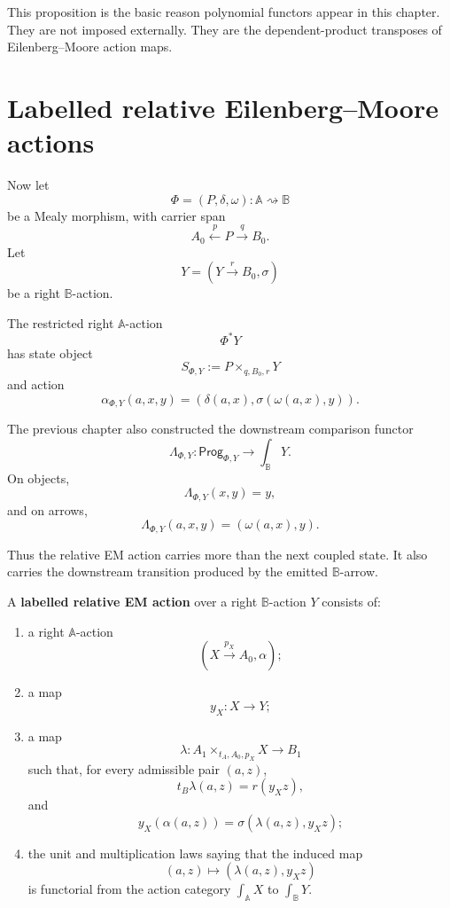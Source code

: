 \begin{remark}
\label{rem:poly-relative-first-inevitability}
This proposition is the basic reason polynomial functors appear in this
chapter.  They are not imposed externally.  They are the dependent-product
transposes of Eilenberg--Moore action maps.
\end{remark}

\section{Labelled relative Eilenberg--Moore actions}
\label{sec:poly-relative-labelled-relative-em-actions}

Now let
\[
\Phi=(P,\delta,\omega):\mathbb A\rightsquigarrow\mathbb B
\]
be a Mealy morphism, with carrier span
\[
A_0\xleftarrow{p}P\xrightarrow{q}B_0.
\]
Let
\[
Y=(Y\xrightarrow{r}B_0,\sigma)
\]
be a right \(\mathbb B\)-action.

The restricted right \(\mathbb A\)-action
\[
\Phi^\ast Y
\]
has state object
\[
S_{\Phi,Y}:=P\times_{q,B_0,r}Y
\]
and action
\[
\alpha_{\Phi,Y}(a,x,y)
=
\left(
\delta(a,x),
\sigma(\omega(a,x),y)
\right).
\]

The previous chapter also constructed the downstream comparison functor
\[
\Lambda_{\Phi,Y}:
\mathsf{Prog}_{\Phi,Y}\to\int_{\mathbb B}Y.
\]
On objects,
\[
\Lambda_{\Phi,Y}(x,y)=y,
\]
and on arrows,
\[
\Lambda_{\Phi,Y}(a,x,y)
=
(\omega(a,x),y).
\]

Thus the relative EM action carries more than the next coupled state.  It also
carries the downstream transition produced by the emitted \(\mathbb B\)-arrow.

\begin{definition}
\label{def:poly-relative-labelled-relative-em-action}
A \textbf{labelled relative EM action} over a right \(\mathbb B\)-action \(Y\)
consists of:
\begin{enumerate}
\item a right \(\mathbb A\)-action
\[
(X\xrightarrow{p_X}A_0,\alpha);
\]
\item a map
\[
y_X:X\to Y;
\]
\item a map
\[
\lambda:
A_1\times_{t_A,A_0,p_X}X\to B_1
\]
such that, for every admissible pair \((a,z)\),
\[
t_B\lambda(a,z)=r(y_Xz),
\]
and
\[
y_X(\alpha(a,z))=\sigma(\lambda(a,z),y_Xz);
\]
\item the unit and multiplication laws saying that the induced map
\[
(a,z)\longmapsto(\lambda(a,z),y_Xz)
\]
is functorial from the action category \(\int_{\mathbb A}X\) to
\(\int_{\mathbb B}Y\).
\end{enumerate}
\end{definition}

